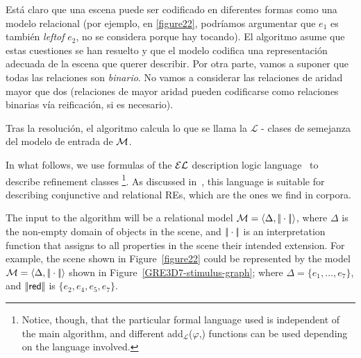 
Est\'a claro que una escena puede ser codificado en diferentes formas como una
modelo relacional (por ejemplo, en \ref{figure22}, podr\'{i}amos argumentar que
$e_1$ es tambi\'en \emph{leftof} $e_2$, no se considera porque hay
tocando). El algoritmo asume que estas cuestiones se han resuelto
y que el modelo codifica una representaci\'on adecuada de la escena que
querer describir. Por otra parte, vamos a suponer que todas las relaciones son
\emph{binario}. No vamos a considerar las relaciones de aridad mayor que
dos (relaciones de mayor aridad pueden codificarse como relaciones binarias v\'{i}a
reificaci\'on, si es necesario).



Tras la resoluci\'on, el algoritmo calcula lo que se llama la
$\mathcal{L}$ - clases de semejanza del modelo de entrada de $\mathcal{M}$.


In what follows, we use formulas of the $\mathcal{EL}$ description logic
language~\cite{baad:desc03} to describe refinement classes
\footnote{Notice, though, that the particular formal language used is
  independent of the main algorithm, and different
  add$_{\mathcal{L}}$($\varphi$,\RE) functions can be used depending
  on the language involved.}.  As discussed
in~\cite{arec2:2008:Areces}, this language is suitable for describing
conjunctive and relational REs, which are the ones we find in corpora.

 The input to the algorithm will be a relational model $\mathcal{M} =
 \langle \Delta, |\!|\cdot|\!| \rangle$, where $\Delta$ is the non-empty domain
 of objects in the scene, and $|\!|\cdot|\!|$ is an interpretation
 function that assigns to all properties in the scene their intended
 extension.  For example, the scene shown in Figure~\ref{figure22}
 could be represented by the model $\mathcal{M}=\langle \Delta,|\!|\cdot|\!| \rangle$
 shown in Figure~\ref{GRE3D7-stimulus-graph}; where $\Delta =
 \{e_1,\ldots,e_7\}$, and $|\!|\textsf{red}|\!|$ is $\{e_2, e_4, e_5,
 e_7\}$.

